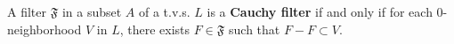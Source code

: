 A filter $\mathfrak{F}$ in a subset $A$ of a t.v.s. $L$ is a \textbf{Cauchy filter} if and only if for each $0$-neighborhood $V$ in $L$, there exists $F \in \mathfrak{F}$ such that $F - F \subset V$.

